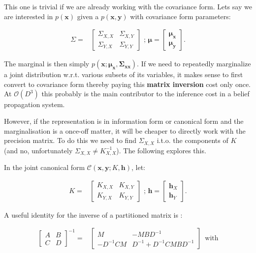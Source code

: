 This one is trivial if we are already working with the covariance
form. Lets say we are interested in $p(\mathbf{x})$ given a $p(\mathbf{x},\mathbf{y})$
with covariance form parameters:

\begin{align*}
\Sigma= & \left[\begin{array}{cc}
\Sigma_{X,X} & \Sigma_{X,Y}\\
\Sigma_{Y,X} & \Sigma_{Y,Y}
\end{array}\right]\mbox{ ; }\mathbf{\mu}=\left[\begin{array}{c}
\mathbf{\mu_{x}}\\
\mathbf{\mu_{y}}
\end{array}\right].
\end{align*}


The marginal is then simply $p(\mathbf{x;\mathbf{\mu_{x}},\mathbf{\Sigma_{xx}}})$.
If we need to repeatedly marginalize a joint distribution w.r.t. various
subsets of its variables, it makes sense to first convert to covariance
form thereby paying this \textbf{matrix inversion} cost only once.
At $\mathcal{O}(D^{3})$ this probably is the main contributor to
the inference cost in a belief propagation system.

However, if the representation is in information form or canonical
form and the marginalisation is a once-off matter, it will be cheaper
to directly work with the precision matrix. To do this we need to
find $\Sigma_{X,X}$ i.t.o. the components of $K$ (and no,
unfortunately $\Sigma_{X,X}\neq K_{X,X}^{-1}$).
The following explores this.

In the joint canonical form $\mathcal{C}(\mathbf{x},\mathbf{y};K,\mathbf{h})$,
let:

\begin{align*}
K= & \left[\begin{array}{cc}
K_{X,X} & K_{X,Y}\\
K_{Y,X} & K_{Y,Y}
\end{array}\right]\mbox{ ; }\mathbf{h}=\left[\begin{array}{c}
\mathbf{h}_{X}\\
\mathbf{h}_{Y}
\end{array}\right].
\end{align*}


A useful identity for the inverse of a partitioned matrix is \cite[pg 87]{Bishop2006}:

\begin{align*}
\left[\begin{array}{cc}
A & B\\
C & D
\end{array}\right]^{-1}= & \left[\begin{array}{cc}
M & -MBD^{-1}\\
-D^{-1}CM & D^{-1}+D^{-1}CMBD^{-1}
\end{array}\right]\,\text{ with}
\end{align*}


